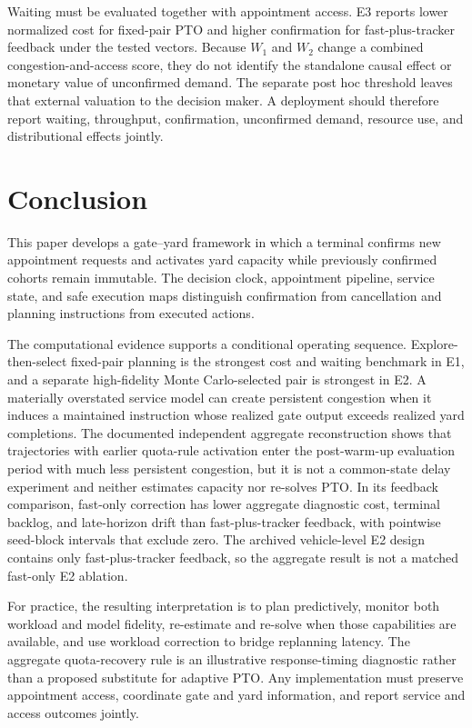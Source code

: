 \documentclass[preprint,12pt,authoryear,a4paper]{elsarticle}
\begin{document}
Waiting must be evaluated together with appointment access. E3 reports lower normalized cost for fixed-pair PTO and higher confirmation for fast-plus-tracker feedback under the tested vectors. Because \(W_1\) and \(W_2\) change a combined congestion-and-access score, they do not identify the standalone causal effect or monetary value of unconfirmed demand. The separate post hoc threshold leaves that external valuation to the decision maker. A deployment should therefore report waiting, throughput, confirmation, unconfirmed demand, resource use, and distributional effects jointly.
\section{Conclusion}
\label{sec:conclusion}

This paper develops a gate--yard framework in which a terminal confirms new appointment requests and activates yard capacity while previously confirmed cohorts remain immutable. The decision clock, appointment pipeline, service state, and safe execution maps distinguish confirmation from cancellation and planning instructions from executed actions.

The computational evidence supports a conditional operating sequence. Explore-then-select fixed-pair planning is the strongest cost and waiting benchmark in E1, and a separate high-fidelity Monte Carlo-selected pair is strongest in E2. A materially overstated service model can create persistent congestion when it induces a maintained instruction whose realized gate output exceeds realized yard completions. The documented independent aggregate reconstruction shows that trajectories with earlier quota-rule activation enter the post-warm-up evaluation period with much less persistent congestion, but it is not a common-state delay experiment and neither estimates capacity nor re-solves PTO. In its feedback comparison, fast-only correction has lower aggregate diagnostic cost, terminal backlog, and late-horizon drift than fast-plus-tracker feedback, with pointwise seed-block intervals that exclude zero. The archived vehicle-level E2 design contains only fast-plus-tracker feedback, so the aggregate result is not a matched fast-only E2 ablation.

For practice, the resulting interpretation is to plan predictively, monitor both workload and model fidelity, re-estimate and re-solve when those capabilities are available, and use workload correction to bridge replanning latency. The aggregate quota-recovery rule is an illustrative response-timing diagnostic rather than a proposed substitute for adaptive PTO. Any implementation must preserve appointment access, coordinate gate and yard information, and report service and access outcomes jointly.
\end{document}
